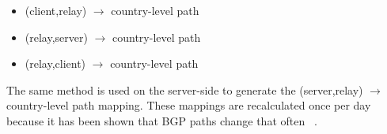 \begin{itemize}
\item (client,relay) $\rightarrow$ country-level path
\item (relay,server) $\rightarrow$ country-level path
\item (relay,client) $\rightarrow$ country-level path
\end{itemize}

The same method is used on the server-side to generate the (server,relay) $\rightarrow$ country-level path mapping.  These mappings are recalculated once per day because it has been shown that BGP paths change that often~\cite{} .
